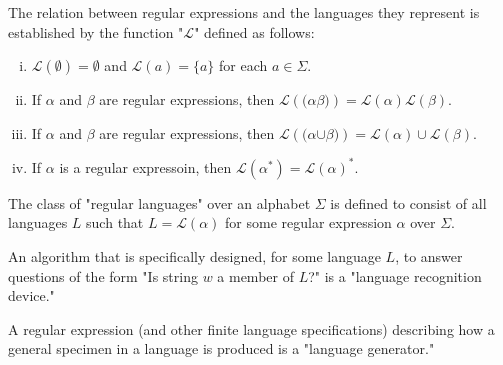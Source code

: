 \documentclass[a4paper,11pt]{article}
\begin{document}
\begin{outline}
    The relation between regular expressions and the languages they represent is established by the function
    "\(\mathcal{L}\)" defined as follows:
    \begin{enumerate}[i.]
      \item 
        \(\mathcal{L}(\pmb{\emptyset}) = \emptyset\) and \(\mathcal{L}(a)=\{a\}\) for each \(a \in \Sigma\).
      \item 
        If \(\alpha\) and \(\beta\) are regular expressions, then 
        \(\mathcal{L}(\pmb{(}\alpha\beta\pmb{)}) = \mathcal{L}(\alpha)\mathcal{L}(\beta)\).
      \item
        If \(\alpha\) and \(\beta\) are regular expressions, then
        \(\mathcal{L}(\pmb{(}\alpha\pmb{\cup}\beta\pmb{)}) = \mathcal{L}(\alpha)\cup\mathcal{L}(\beta)\).
      \item
        If \(\alpha\) is a regular expressoin, then \(\mathcal{L}(\alpha^{\pmb{*}}) = \mathcal{L}(\alpha)^*\).
    \end{enumerate}

    The class of "regular languages" over an alphabet \(\Sigma\) is defined to consist of all languages \(L\) such
    that \(L = \mathcal{L}(\alpha)\) for some regular expression \(\alpha\) over \(\Sigma\).
    
    An algorithm that is specifically designed, for some language \(L\), to answer questions of the form
    "Is string \(w\) a member of \(L\)?" is a "language recognition device."
    
    A regular expression (and other finite language specifications) describing how a general specimen in a language is
    produced is a "language generator."

\end{outline}
\end{document}
